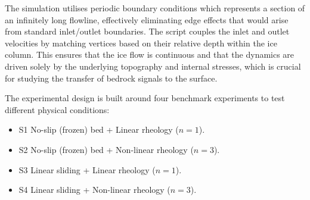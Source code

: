 The simulation utilises periodic boundary conditions which represents a section of an infinitely long flowline, effectively eliminating edge effects that would arise from standard inlet/outlet boundaries. The script couples the inlet and outlet velocities by matching vertices based on their relative depth within the ice column. This ensures that the ice flow is continuous and that the dynamics are driven solely by the underlying topography and internal stresses, which is crucial for studying the transfer of bedrock signals to the surface.

The experimental design is built around four benchmark experiments to test different physical conditions:

\begin{itemize}
\item{S1} No-slip (frozen) bed + Linear rheology ($n=1$).
\item{S2} No-slip (frozen) bed + Non-linear rheology ($n=3$).
\item{S3} Linear sliding + Linear rheology ($n=1$).
\item{S4} Linear sliding + Non-linear rheology ($n=3$).
\end{itemize}






